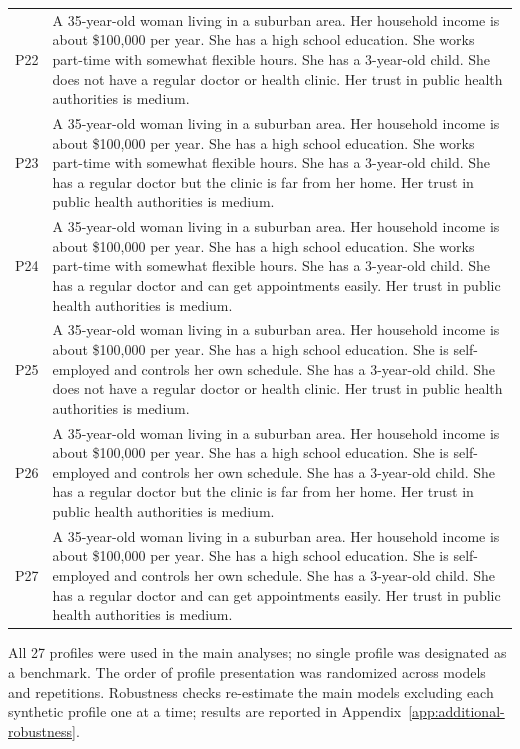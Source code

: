 \documentclass[11pt]{article}
\begin{document}
\begin{longtable}{p{1.2cm}p{12cm}}
P22 & A 35-year-old woman living in a suburban area. Her household income is about \$100,000 per year. She has a high school education. She works part-time with somewhat flexible hours. She has a 3-year-old child. She does not have a regular doctor or health clinic. Her trust in public health authorities is medium. \\
P23 & A 35-year-old woman living in a suburban area. Her household income is about \$100,000 per year. She has a high school education. She works part-time with somewhat flexible hours. She has a 3-year-old child. She has a regular doctor but the clinic is far from her home. Her trust in public health authorities is medium. \\
P24 & A 35-year-old woman living in a suburban area. Her household income is about \$100,000 per year. She has a high school education. She works part-time with somewhat flexible hours. She has a 3-year-old child. She has a regular doctor and can get appointments easily. Her trust in public health authorities is medium. \\
P25 & A 35-year-old woman living in a suburban area. Her household income is about \$100,000 per year. She has a high school education. She is self-employed and controls her own schedule. She has a 3-year-old child. She does not have a regular doctor or health clinic. Her trust in public health authorities is medium. \\
P26 & A 35-year-old woman living in a suburban area. Her household income is about \$100,000 per year. She has a high school education. She is self-employed and controls her own schedule. She has a 3-year-old child. She has a regular doctor but the clinic is far from her home. Her trust in public health authorities is medium. \\
P27 & A 35-year-old woman living in a suburban area. Her household income is about \$100,000 per year. She has a high school education. She is self-employed and controls her own schedule. She has a 3-year-old child. She has a regular doctor and can get appointments easily. Her trust in public health authorities is medium. \\

\end{longtable}

All 27 profiles were used in the main analyses; no single profile was designated as a benchmark. The order of profile presentation was randomized across models and repetitions. Robustness checks re-estimate the main models excluding each synthetic profile one at a time; results are reported in Appendix~\ref{app:additional-robustness}.
\end{document}
